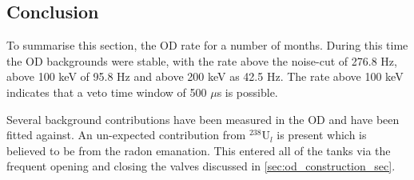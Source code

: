 \subsection{Conclusion}
\par
To summarise this section, the OD rate for a number of months.
During this time the OD backgrounds were stable, with the rate above the noise-cut of 276.8 Hz, above 100 keV of 95.8 Hz and above 200 keV as 42.5 Hz.
The rate above 100 keV indicates that a veto time window of 500 $\mu$s is possible.
\par
Several background contributions have been measured in the OD and have been fitted against.
An un-expected contribution from ${}^{238}$U$_{l}$ is present which is believed to be from the radon emanation.
This entered all of the tanks via the frequent opening and closing the valves discussed in \autoref{sec:od_construction_sec}.
